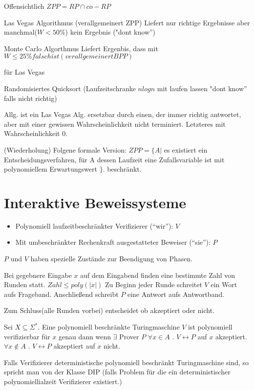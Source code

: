 Offensichtlich $ZPP = RP \cap co - RP$

Las Vegas Algorithmus (verallgemeinert ZPP) Liefert nur richtige Ergebnisse aber manchmal($W<50\%$) kein Ergebnis ("dont know'')

Monte Carlo Algorthmus Liefert Ergenbis, dass mit $W \leq 25\% falsch ist (verallgemeinert BPP)$

\begin{beispiel}
für Las Vegas

Randomisiertes Quicksort (Laufzeitschranke $n log n$ mit laufen lassen
"dont know'' falls nicht richtig)
\end{beispiel}

Allg. ist ein Las Vegas Alg. ersetzbar durch einen, der immer richtig
antwortet, aber mit einer gewissen Wahrscheinlichkeit nicht
terminiert. Letzteres mit Wahrscheinlichkeit $0$.

(Wiederholung)
Folgene formale Version:
$ZPP = \{A |$ es existiert ein Entscheidungsverfahren, für A dessen Laufzeit eine Zufallsvariable ist mit polynomiellem Erwartungswert $\}$. beschränkt.

\section{Interaktive Beweissysteme}
\begin{itemize}
\item Polynomiell laufzeitbeschränkter Verifizierer (``wir''): $V$
\item Mit umbeschränkter Rechenkraft ausgestatteter Beweiser (``sie''): $P$
\end{itemize}


$P$ und $V$ haben spezielle Zustände zur Beendigung von Phasen.

Bei gegebnere Eingabe $x$ auf dem Eingabend finden eine bestimmte Zahl von Runden statt.
$Zahl \leq poly (|x|)$
Zu Beginn jeder Runde schreitet $V$ ein Wort aufs Frageband. Anschließend schreibt $P$ eine Antwort aufs Antwortband.

Zum Schluss(alle Runden vorbei) entscheidet ob akzeptiert oder nicht.

\begin{definition}
Sei $X \subseteq \Sigma^*$. Eine polynomiell beschränkte Turingmaschine $V$ ist polynomiell verifizierbar für $x$
genau dann wenn $ \exists$ Prover $P$
$\forall x \in A$ . $V \leftrightarrow P$ auf $x$ akzeptiert. $\forall x \notin A$ . $V \leftrightarrow P$   akzeptiert auf $x$ nicht.

Falls Verifizierer deterministische polynomiell beschränkt
Turingmaschine sind, so spricht man von der Klasse DIP (falls Problem für
die ein deterministischer polynomiellialzeit Verifizierer existiert.)
\end{definition}

